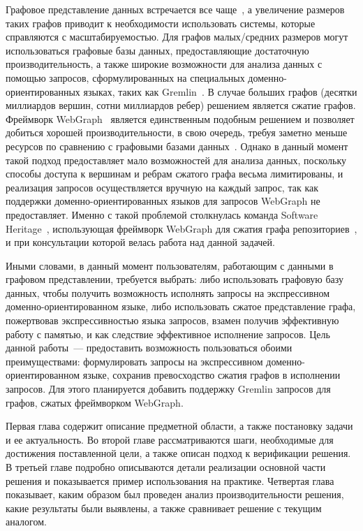 \documentclass[times,specification,annotation]{itmo-student-thesis}
\begin{document}
Графовое представление данных встречается все чаще~\cite{big-graphs-future-arxiv}, а увеличение размеров таких графов приводит к необходимости использовать системы, которые справляются с масштабируемостью. Для графов малых/средних размеров могут использоваться графовые базы данных, предоставляющие достаточную производительность, а также широкие возможности для анализа данных с помощью запросов, сформулированных на специальных доменно-ориентированных языках, таких как Gremlin~\cite{gremlin}. В случае больших графов (десятки миллиардов вершин, сотни миллиардов ребер) решением является сжатие графов. Фреймворк WebGraph~\cite{webgraph} является единственным подобным решением и позволяет добиться хорошей производительности, в свою очередь,  требуя заметно меньше ресурсов по сравнению с графовыми базами данных~\cite{graph-db-scale, scale-cost, swh-antoine, saner}. Однако в данный момент такой подход предоставляет мало возможностей для анализа данных, поскольку способы доступа к вершинам и ребрам сжатого графа весьма лимитированы, и реализация запросов осуществляется вручную на каждый запрос, так как поддержки доменно-ориентированных языков для запросов WebGraph не предоставляет. Именно с такой проблемой столкнулась команда Software Heritage~\cite{swh-main-page, swh-intern}, использующая фреймворк WebGraph для сжатия графа репозиториев~\cite{saner}, и при консультации которой велась работа над данной задачей.

Иными словами, в данный момент пользователям, работающим с данными в графовом представлении, требуется выбрать: либо использовать графовую базу данных, чтобы получить возможность исполнять запросы на экспрессивном доменно-ориентированном языке, либо использовать сжатое представление графа, пожертвовав экспрессивностью языка запросов, взамен получив эффективную работу с памятью, и как следствие эффективное исполнение запросов.
Цель данной работы~--- предоставить возможность пользоваться обоими преимуществами: формулировать запросы на экспрессивном доменно-ориентированном языке, сохранив превосходство сжатия графов в исполнении запросов. Для этого планируется добавить поддержку Gremlin запросов для графов, сжатых фреймворком WebGraph.

Первая глава содержит описание предметной области, а также постановку задачи и ее актуальность. Во второй главе рассматриваются шаги, необходимые для достижения поставленной цели, а также описан подход к верификации решения. В третьей главе подробно описываются детали реализации основной части решения и показывается пример использования на практике. Четвертая глава показывает, каким образом был проведен анализ производительности решения, какие результаты были выявлены, а также сравнивает решение с текущим аналогом.
\end{document}
